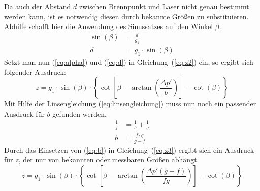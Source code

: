 Da auch der Abstand $d$ zwischen Brennpunkt und Laser nicht genau bestimmt werden kann, ist es notwendig diesen durch bekannte Größen zu substituieren. Abhilfe schafft hier die Anwendung des Sinussatzes auf den Winkel $\beta$.
\begin{align}
	\sin(\beta) &= \frac{d}{g_1}\\
	d &= g_1\cdot\sin(\beta)
	\label{eq:d}
\end{align}
Setzt man nun (\ref{eq:alpha}) und (\ref{eq:d}) in Gleichung~(\ref{eq:z2}) ein, so ergibt sich folgender Ausdruck:
\begin{equation}
	z = g_1\cdot\sin(\beta)\cdot\left\{\cot\left[\beta-\arctan\left(\frac{\Delta p'}{b}\right)\right]-\cot(\beta)\right\}
	\label{eq:z3}
\end{equation}
Mit Hilfe der Linsengleichung (\ref{eq:linsengleichung}) muss nun noch ein passender Ausdruck für $b$ gefunden werden.
\begin{align}
	\frac{1}{f} &= \frac{1}{b} + \frac{1}{g} \label{eq:linsengleichung}\\
	b &= \frac{f\cdot g}{g-f} \label{eq:b}
\end{align}
Durch das Einsetzen von (\ref{eq:b}) in Gleichung~(\ref{eq:z3}) ergibt sich ein Ausdruck für $z$, der nur von bekannten oder messbaren Größen abhängt. 
\begin{equation}
	z = g_1\cdot\sin(\beta)\cdot\left\{\cot\left[\beta-\arctan\left(\frac{\Delta p'(g-f)}{fg}\right)\right]-\cot(\beta)\right\}
	\label{eq:zfinal}
\end{equation}